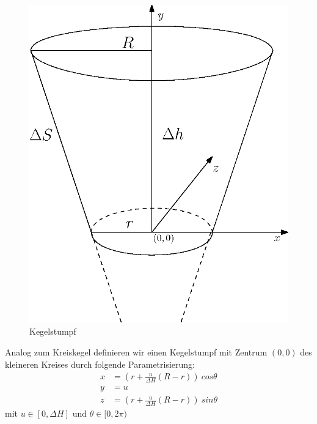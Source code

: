 \begin{figure}[!htb]
	\centering
	\includegraphics[scale=.7]{images/coneFrustum.eps}
	\caption{Kegelstumpf}
	\label{fig:coneFrustum}
\end{figure}

Analog zum Kreiskegel definieren wir einen Kegelstumpf mit Zentrum $(0,0)$ des kleineren Kreises durch folgende Parametrisierung: 
\begin{equation} \label{eq:paramFrustum}
\begin{aligned}
x &= (r + \frac{u}{\Delta H} (R - r))~cos \theta \\
y &= u \\
z &= (r + \frac{u}{\Delta H} (R - r))~sin \theta
\end{aligned}
\end{equation}
mit $u\in [0, \Delta H]$ und $\theta \in [0, 2\pi)$


